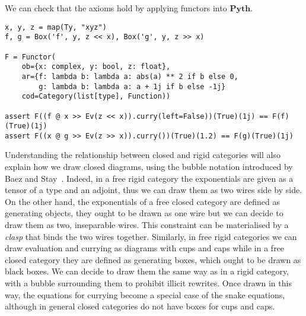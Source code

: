 \begin{example}
We can check that the axioms hold by applying functors into $\mathbf{Pyth}$.

\begin{verbatim}
x, y, z = map(Ty, "xyz")
f, g = Box('f', y, z << x), Box('g', y, z >> x)

F = Functor(
    ob={x: complex, y: bool, z: float},
    ar={f: lambda b: lambda a: abs(a) ** 2 if b else 0,
        g: lambda b: lambda a: a + 1j if b else -1j}
    cod=Category(list[type], Function))

assert F((f @ x >> Ev(z << x)).curry(left=False))(True)(1j) == F(f)(True)(1j)
assert F((x @ g >> Ev(z >> x)).curry())(True)(1.2) == F(g)(True)(1j)
\end{verbatim}
\end{example}

Understanding the relationship between closed and rigid categories will also explain how we draw closed diagrams, using the bubble notation introduced by Baez and Stay~\cite[Section~2.6]{BaezStay09}.
Indeed, in a free rigid category the exponentials are given as a tensor of a type and an adjoint, thus we can draw them as two wires side by side.
On the other hand, the exponentials of a free closed category are defined as generating objects, they ought to be drawn as one wire but we can decide to draw them as two, inseparable wires.
This constraint can be materialised by a \emph{clasp} that binds the two wires together.
Similarly, in free rigid categories we can draw evaluation and currying as diagrams with cups and caps while in a free closed category they are defined as generating boxes, which ought to be drawn as black boxes.
We can decide to draw them the same way as in a rigid category, with a bubble surrounding them to prohibit illicit rewrites.
Once drawn in this way, the equations for currying become a special case of the snake equations, although in general closed categories do not have boxes for cups and caps.


